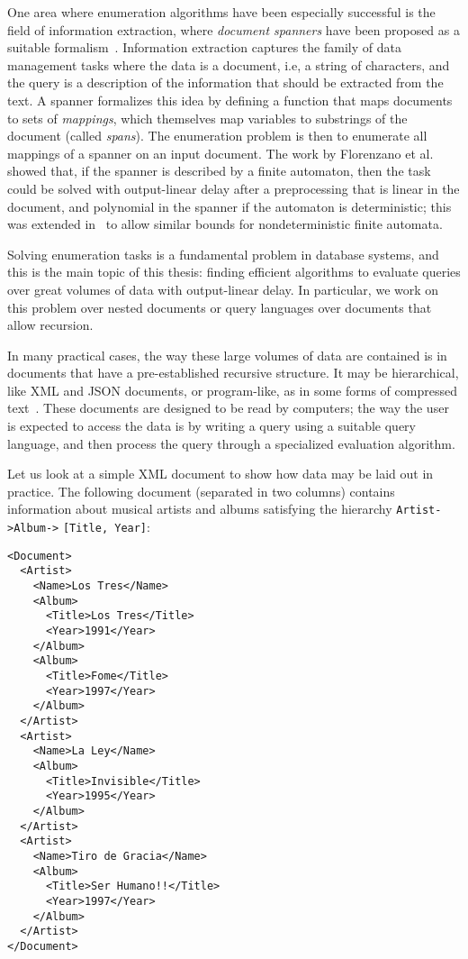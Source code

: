 One area where enumeration algorithms have been especially successful is the field of information extraction, where {\em document spanners} have been proposed as a suitable formalism~\cite{FaginKRV15}. Information extraction captures the family of data management tasks where the data is a document, i.e, a string of characters, and the query is a description of the information that should be extracted from the text. A spanner formalizes this idea by defining a function that maps documents to sets of {\em mappings}, which themselves map variables to substrings of the document (called {\em spans}). The enumeration problem is then to enumerate all mappings of a spanner on an input document.
The work by Florenzano et al.~\cite{FlorenzanoRUVV20} showed that, if the spanner is described by a finite automaton, then the task could be solved with output-linear delay after a preprocessing that is linear in the document, and polynomial in the spanner if the automaton is deterministic; this was extended in~\cite{amarilli2019constant} to allow similar bounds for nondeterministic finite automata.

Solving enumeration tasks is a fundamental problem in database systems, and this is the main topic of this thesis: finding efficient algorithms to evaluate queries over great volumes of data with output-linear delay. In particular, we work on this problem over nested documents or query languages over documents that allow recursion.

In many practical cases, the way these large volumes of data are contained is in documents that have a pre-established recursive structure. It may be hierarchical, like XML and JSON documents, or program-like, as in some forms of compressed text~\cite{LZ77, StorerS82, ClaudeN11}. These documents are designed to be read by computers; the way the user is expected to access the data is by writing a query using a suitable query language, and then process the query through a specialized evaluation algorithm.

Let us look at a simple XML document to show how data may be laid out in practice. The following document (separated in two columns) contains information about musical artists and albums satisfying the hierarchy {\tt Artist->Album->} {\tt [Title, Year]}:
	
\begin{multicols}{2}
	\begin{small}
	\begin{verbatim}
<Document>
  <Artist>
    <Name>Los Tres</Name>
    <Album>
      <Title>Los Tres</Title>
      <Year>1991</Year>
    </Album>
    <Album>
      <Title>Fome</Title>
      <Year>1997</Year>
    </Album>
  </Artist>
  <Artist>
    <Name>La Ley</Name>
    <Album>
      <Title>Invisible</Title>
      <Year>1995</Year>
    </Album>
  </Artist>
  <Artist>
    <Name>Tiro de Gracia</Name>
    <Album>
      <Title>Ser Humano!!</Title>
      <Year>1997</Year>
    </Album>
  </Artist>
</Document>
	\end{verbatim}
	\end{small}
\end{multicols}

